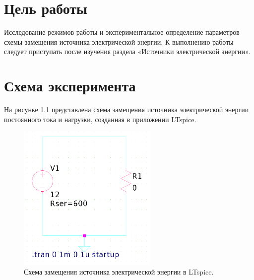 \documentclass[a4paper]{article}
\begin{document}
\thispagestyle{empty}

\newpage
\pagestyle{plain}
\setcounter{page}{1}

\section{Цель работы}
Исследование режимов работы и экспериментальное определение параметров схемы замещения источника электрической энергии. К выполнению работы следует приступать после изучения раздела «Источники электрической энергии».

\section{Схема эксперимента}
На рисунке 1.1 представлена схема замещения источника электрической энергии постоянного тока и нагрузки, созданная в приложении LTspice.

\begin{figure}[H]
	\centering
	\includegraphics[width=0.6\textwidth]{schema.png} %
	\caption{Схема замещения источника электрической энергии в LTspice.}
\end{figure}






\end{document}

